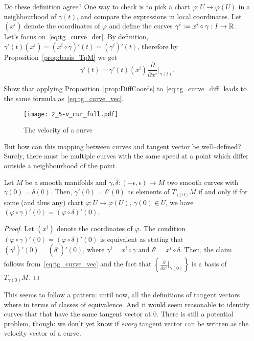 Do these definition agree?
One way to check is to pick a chart $\varphi: U \to \varphi(U)$ in a neighbourhood of $\gamma(t)$, and compare the expressions in local coordinates. Let $(x^i)$ denote the coordinates of $\varphi$ and define the curves $\gamma^i := x^i \circ \gamma : I\to\mathbb{R}$.
Let's focus on~\eqref{eq:tg_curve_der}. By definition, $\gamma'(t)(x^i) = (x^i\circ\gamma)'(t) = (\gamma^i)'(t)$, therefore by Proposition~\ref{prop:basis_TpM} we get
\begin{equation}\label{eq:tg_curve_vec}
  \gamma'(t) = %
    \gamma'(t)(x^i) \frac{\partial}{\partial x^i}\Big|_{\gamma(t)}.
\end{equation}
\begin{exercise}
  Show that applying Proposition~\ref{prop:DiffCoords} to~\eqref{eq:tg_curve_diff} leads to the same formula as~\eqref{eq:tg_curve_vec}.
\end{exercise}

\begin{figure*}[htp]
  \centering
  \texttt{[image: 2\_5-v\_cur\_full.pdf]}
  \caption{The velocity of a curve}
  \label{fig:2_5-v_cur_full}
\end{figure*}

But how can this mapping between curves and tangent vector be well--defined?
Surely, there must be multiple curves with the same speed at a point which differ outside a neighbourhood of the point.

\begin{lemma}\label{lem:equiv_tg_curves}
  Let $M$ be a smooth manifolds and $\gamma, \delta : (-\epsilon, \epsilon) \to M$ two smooth curves with $\gamma(0) = \delta(0)$. Then, $\gamma'(0) = \delta'(0)$ as elements of $T_{\gamma(0)}M$ if and only if for some (and thus any) chart $\varphi:U\to\varphi(U)$, $\gamma(0)\in U$, we have $(\varphi\circ \gamma)'(0) = (\varphi\circ\delta)'(0)$.
\end{lemma}
\begin{proof}
  Let $(x^i)$ denote the coordinates of $\varphi$. The condition $(\varphi\circ \gamma)'(0) = (\varphi\circ\delta)'(0)$ is equivalent as stating that $(\gamma^i)'(0) = (\delta^i)'(0)$, where $\gamma^i = x^i\circ\gamma$ and $\delta^i=x^i\circ\delta$. Then, the claim follows from~\eqref{eq:tg_curve_vec} and the fact that $\left\{\frac{\partial}{\partial x^i}\big|_{\gamma(0)}\right\}$ is a basis of $T_{\gamma(0)}M$.
\end{proof}

This seems to follow a pattern: until now, all the definitions of tangent vectors where in terms of classes of equivalence.
And it would seem reasonable to identify curves that that have the same tangent vector at $0$.
There is still a potential problem, though: we don't yet know if \emph{every} tangent vector can be written as the velocity vector of a curve.

